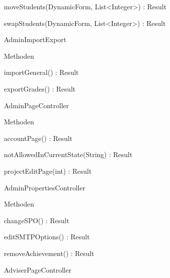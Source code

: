 \documentclass[parskip=full]{scrartcl}
\begin{document}
\begin{itemPackage}
\begin{itemClass}
\begin{itemClassSub}
\begin{itemPlus}
\end{itemPlus}
\begin{itemChange}
\item moveStudents(DynamicForm, List<Integer>) : Result
\item swapStudents(DynamicForm, List<Integer>) : Result
\end{itemChange}
\end{itemClassSub}
\item AdminImportExport
\item \begin{itemClassSub}
\item Methoden
\begin{itemPlus}
\item importGeneral() : Result
\item exportGrades() : Result
\end{itemPlus}
\end{itemClassSub}
\item AdminPageController
\item \begin{itemClassSub}
\item Methoden
\begin{itemPlus}
\item accountPage() : Result
\item notAllowedInCurrentState(String) : Result
\end{itemPlus}
\begin{itemChange}
\item projectEditPage(int) : Result
\end{itemChange}
\end{itemClassSub}
\item AdminPropertiesController
\item \begin{itemClassSub}
\item Methoden
\begin{itemPlus}
\item changeSPO() : Result
\item editSMTPOptions() : Result
\end{itemPlus}
\begin{itemMinus}
\item removeAchievement() : Result
\end{itemMinus}
\end{itemClassSub}
\item AdviserPageController
\item \begin{itemClassSub}

\end{itemClassSub}
\end{itemClass}
\end{itemPackage}
\end{document}
